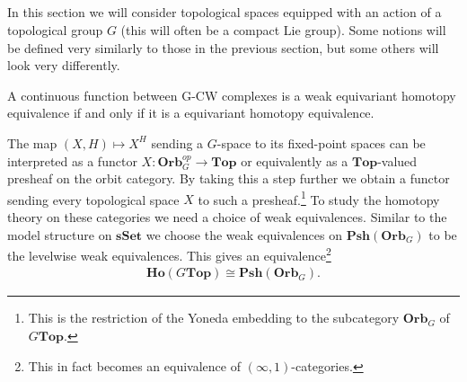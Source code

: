 \subsection{}

    In this section we will consider topological spaces equipped with an action of a topological group $G$ (this will often be a compact Lie group). Some notions will be defined very similarly to those in the previous section, but some others will look very differently.



    \begin{theorem}
        A continuous function between G-CW complexes is a weak equivariant homotopy equivalence if and only if it is a equivariant homotopy equivalence.
    \end{theorem}

    \begin{theorem}[Elmendorf]
        The map $(X, H)\mapsto X^H$ sending a $G$-space to its fixed-point spaces can be interpreted as a functor $X:\mathbf{Orb}_G^{op}\rightarrow\mathbf{Top}$ or equivalently as a $\mathbf{Top}$-valued presheaf on the orbit category. By taking this a step further we obtain a functor sending every topological space $X$ to such a presheaf.\footnote{This is the restriction of the Yoneda embedding to the subcategory $\mathbf{Orb}_G$ of $G\mathbf{Top}$.} To study the homotopy theory on these categories we need a choice of weak equivalences. Similar to the model structure on $\mathbf{sSet}$ we choose the weak equivalences on $\mathbf{Psh}(\mathbf{Orb}_G)$ to be the levelwise weak equivalences. This gives an equivalence\footnote{This in fact becomes an equivalence of $(\infty, 1)$-categories.}
        \begin{gather}
            \mathbf{Ho}(G\mathbf{Top})\cong\mathbf{Psh}(\mathbf{Orb}_G).
        \end{gather}
    \end{theorem}

